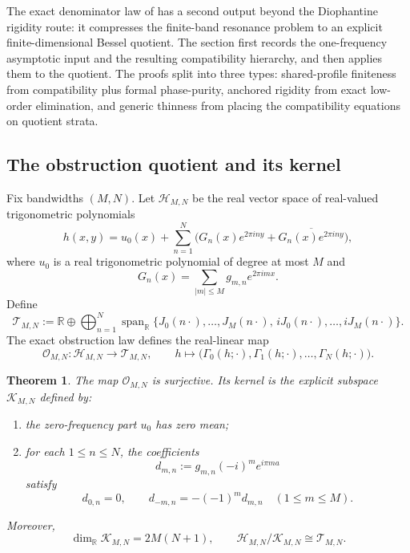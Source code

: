 \documentclass[11pt,reqno]{amsart}
\newtheorem{theorem}{Theorem}[section]
\theoremstyle{definition}
\newcommand{\R}{\mathbb{R}}
\newcommand{\e}[1]{e^{2\pi i #1}}
\newcommand{\abs}[1]{\left\lvert #1 \right\rvert}
\begin{document}
The exact denominator law of  has a second output beyond the Diophantine
rigidity route: it compresses the finite-band resonance problem to an explicit finite-dimensional
Bessel quotient. The section first records the one-frequency asymptotic input and the resulting
compatibility hierarchy, and then applies them to the quotient. The proofs split into three
types: shared-profile finiteness from compatibility plus formal phase-purity, anchored rigidity
from exact low-order elimination, and generic thinness from placing the compatibility equations on
quotient strata.

\subsection*{The obstruction quotient and its kernel}

Fix bandwidths $(M,N)$. Let $\mathcal H_{M,N}$ be the real vector space of real-valued
trigonometric polynomials
\[
h(x,y)=u_0(x)+\sum_{n=1}^N \bigl(G_n(x)\e{ny}+\overline{G_n(x)\e{ny}}\bigr),
\]
where $u_0$ is a real trigonometric polynomial of degree at most $M$ and
\[
G_n(x)=\sum_{\abs{m}\le M} g_{m,n}\e{mx}.
\]
Define
\[
\mathcal T_{M,N}
:=
\R
\oplus
\bigoplus_{n=1}^N
\operatorname{span}_{\R}
\{J_0(n\cdot),\dots,J_M(n\cdot),\, iJ_0(n\cdot),\dots,iJ_M(n\cdot)\}.
\]
The exact obstruction law defines the real-linear map
\[
\mathcal O_{M,N}:\mathcal H_{M,N}\to \mathcal T_{M,N},
\qquad
h\mapsto \bigl(\Gamma_0(h;\cdot),\Gamma_1(h;\cdot),\dots,\Gamma_N(h;\cdot)\bigr).
\]

\begin{theorem}\label{thm:obstruction-quotient}
The map $\mathcal O_{M,N}$ is surjective. Its kernel is the explicit subspace $\mathcal K_{M,N}$
defined by:
\begin{enumerate}[label=\emph{(\roman*)}]
\item the zero-frequency part $u_0$ has zero mean;
\item for each $1\le n\le N$, the coefficients
\[
d_{m,n}:=g_{m,n}(-i)^m e^{i\pi m a}
\]
satisfy
\[
d_{0,n}=0,
\qquad
d_{-m,n}=-(-1)^m d_{m,n}\quad (1\le m\le M).
\]
\end{enumerate}
Moreover,
\[
\dim_{\R}\mathcal K_{M,N}=2M(N+1),
\qquad
\mathcal H_{M,N}/\mathcal K_{M,N}\cong \mathcal T_{M,N}.
\]
\end{theorem}
\end{document}
